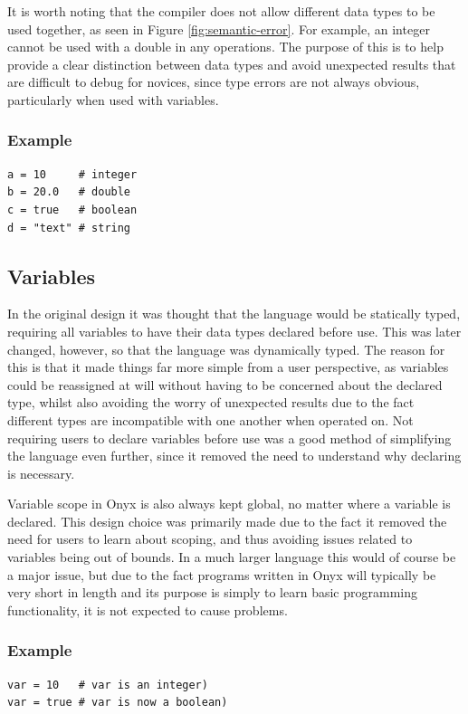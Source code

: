 \documentclass[
]{report}
\begin{document}
It is worth noting that the compiler does not allow different data types
to be used together, as seen in Figure \ref{fig:semantic-error}. For example, 
an integer cannot be used with a double in any operations. The purpose of 
this is to help provide a clear distinction between data types and avoid 
unexpected results that are difficult to debug for novices, since type errors 
are not always obvious, particularly when used with variables.

\subsubsection{Example}
\begin{verbatim}
a = 10     # integer
b = 20.0   # double
c = true   # boolean
d = "text" # string
\end{verbatim}

\subsection{Variables}
In the original design it was thought that the language would be
statically typed, requiring all variables to have their data types
declared before use. This was later changed, however, so that the
language was dynamically typed. The reason for this is that it made
things far more simple from a user perspective, as variables could be
reassigned at will without having to be concerned about the declared
type, whilst also avoiding the worry of unexpected results due to the
fact different types are incompatible with one another when operated on.
Not requiring users to declare variables before use was a good method of
simplifying the language even further, since it removed the need to
understand why declaring is necessary.

Variable scope in Onyx is also always kept global, no matter where a
variable is declared. This design choice was primarily made due to the
fact it removed the need for users to learn about scoping, and thus
avoiding issues related to variables being out of bounds. In a much
larger language this would of course be a major issue, but due to the
fact programs written in Onyx will typically be very short in length and
its purpose is simply to learn basic programming functionality, it is not
expected to cause problems.

\subsubsection{Example}
\begin{verbatim}
var = 10   # var is an integer)
var = true # var is now a boolean)
\end{verbatim}
\end{document}
